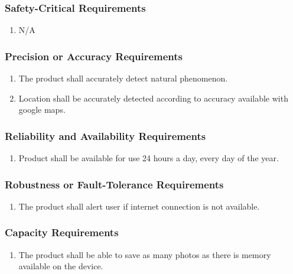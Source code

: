 \documentclass[]{article}
\begin{document}
\subsubsection{Safety-Critical Requirements}
\label{ssub:safety_critical_requirements}
\begin{enumerate}[{PR}1. ]
	\item N/A
\end{enumerate}

\subsubsection{Precision or Accuracy Requirements}
\label{ssub:precision_or_accuracy_requirements}
\begin{enumerate}[{PR}1. ]
	\item The product shall accurately detect natural phenomenon.
	\item Location shall be accurately detected according to accuracy available with google maps.
\end{enumerate}

\subsubsection{Reliability and Availability Requirements}
\label{ssub:reliability_and_availability_requirements}
\begin{enumerate}[{PR}1. ]
	\item Product shall be available for use 24 hours a day, every day of the year.
\end{enumerate}

\subsubsection{Robustness or Fault-Tolerance Requirements}
\label{ssub:robustness_or_fault_tolerance_requirements}
\begin{enumerate}[{PR}1. ]
	\item The product shall alert user if internet connection is not available.
\end{enumerate}

\subsubsection{Capacity Requirements}
\label{ssub:capacity_requirements}
\begin{enumerate}[{PR}1. ]
	\item The product shall be able to save as many photos as there is memory available on the device.
\end{enumerate}
\end{document}
